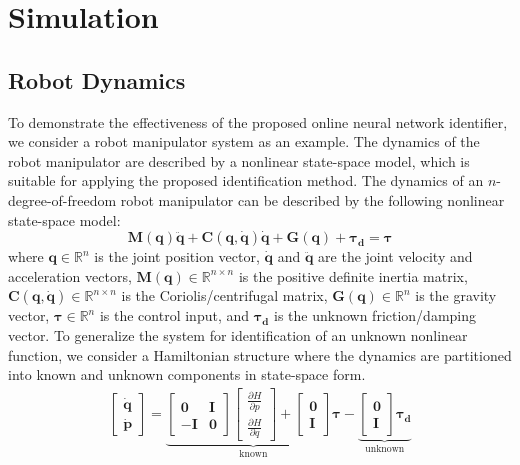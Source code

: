 \documentclass[10pt,twocolumn]{ICCAS}
\newcommand{\R}{\mathbb{R}}
\begin{document}
\section{Simulation}
\subsection{Robot Dynamics}
To demonstrate the effectiveness of the proposed online neural network identifier, we consider a robot manipulator system as an example. The dynamics of the robot manipulator are described by a nonlinear state-space model, which is suitable for applying the proposed identification method. The dynamics of an $n$-degree-of-freedom robot manipulator can be described by the following nonlinear state-space model:
\begin{equation}
    \bm{M}(\bm{q})\ddot{\bm{q}} + \bm{C}(\bm{q}, \dot{\bm{q}})\dot{\bm{q}} + \bm{G}(\bm{q}) + \bm{\tau_{d}}= \bm{\tau}
    \label{eq:robot_dynamics}
\end{equation}
where $\bm{q} \in \R^{n}$ is the joint position vector, $\dot{\bm{q}}$ and $\ddot{\bm{q}}$ are the joint velocity and acceleration vectors, $\bm{M}(\bm{q}) \in \R^{n \times n}$ is the positive definite inertia matrix, $\mathbf{C}(\bm{q}, \dot{\bm{q}}) \in \R^{n \times n}$ is the Coriolis/centrifugal matrix, $\bm{G}(\bm{q}) \in \R^n$ is the gravity vector, $\bm{\tau} \in \R^n$ is the control input, and $\bm{\tau_d}$ is the unknown friction/damping vector.
To generalize the system for identification of an unknown nonlinear function, we consider a Hamiltonian structure where the dynamics are partitioned into known and unknown components in state-space form. 
\begin{align}
    \begin{bmatrix}
        \dot{\bm{q}} \\ \dot{\bm{p}}
    \end{bmatrix}
    =
    \underbrace{
    \begin{bmatrix}
        \mathbf{0} & \mathbf{I} \\
        -\mathbf{I} & \mathbf{0}
    \end{bmatrix}
    \begin{bmatrix}
        \frac{\partial{H}}{\partial{p}} \\ \frac{\partial{H}}{\partial{q}}
    \end{bmatrix}
    +
    \begin{bmatrix}
        \mathbf{0} \\
        \mathbf{I}
    \end{bmatrix} \bm{\tau}}_{\text{known}}
    -
    \underbrace{
    \begin{bmatrix}
        \mathbf{0} \\
        \mathbf{I}
    \end{bmatrix} \bm{\tau_d}
    }_{\text{unknown}}
    \label{eq:robot_dynamics_nonlinear}
\end{align}
\end{document}
